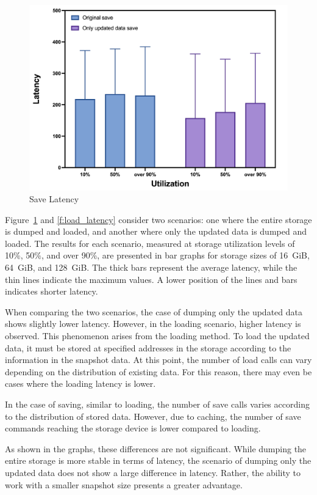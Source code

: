 \begin{figure}[t]
    \centering
	\includegraphics[width=0.95\columnwidth]{graphs/save_latency}
	\caption{Save Latency}
	\label{f:save_latency}
\end{figure}

Figure~\ref{f:save_latency} and \ref{f:load_latency} consider two scenarios: one where the entire storage is dumped and loaded, and another where only the updated data is dumped and loaded.
The results for each scenario, measured at storage utilization levels of 10\%, 50\%, and over 90\%, are presented in bar graphs for storage sizes of 16~GiB, 64~GiB, and 128~GiB.
The thick bars represent the average latency, while the thin lines indicate the maximum values.
A lower position of the lines and bars indicates shorter latency.

When comparing the two scenarios, the case of dumping only the updated data shows slightly lower latency.
However, in the loading scenario, higher latency is observed. This phenomenon arises from the loading method.
To load the updated data, it must be stored at specified addresses in the storage according to the information in the snapshot data.
At this point, the number of load calls can vary depending on the distribution of existing data.
For this reason, there may even be cases where the loading latency is lower.

In the case of saving, similar to loading, the number of save calls varies according to the distribution of stored data.
However, due to caching, the number of save commands reaching the storage device is lower compared to loading.

As shown in the graphs, these differences are not significant.
While dumping the entire storage is more stable in terms of latency, the scenario of dumping only the updated data does not show a large difference in latency.
Rather, the ability to work with a smaller snapshot size presents a greater advantage.


